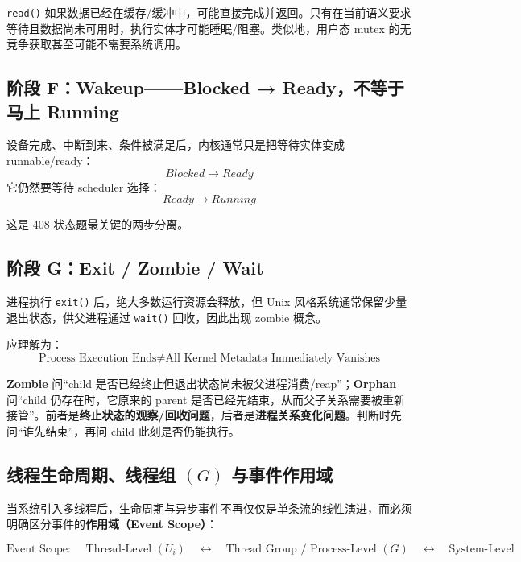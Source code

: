 \documentclass[11pt,a4paper]{ctexart}
\newcommand{\kw}[1]{\textbf{#1}}
\newcommand{\code}[1]{\texttt{#1}}
\begin{document}
\begin{warn}
\code{read()} 如果数据已经在缓存/缓冲中，可能直接完成并返回。只有在当前语义要求等待且数据尚未可用时，执行实体才可能睡眠/阻塞。类似地，用户态 mutex 的无竞争获取甚至可能不需要系统调用。
\end{warn}

\subsection{阶段 F：Wakeup——Blocked → Ready，不等于马上 Running}

设备完成、中断到来、条件被满足后，内核通常只是把等待实体变成 runnable/ready：
\[
\boxed{Blocked\rightarrow Ready}
\]
它仍然要等待 scheduler 选择：
\[
\boxed{Ready\rightarrow Running}
\]

这是 408 状态题最关键的两步分离。

\subsection{阶段 G：Exit / Zombie / Wait}

进程执行 \code{exit()} 后，绝大多数运行资源会释放，但 Unix 风格系统通常保留少量退出状态，供父进程通过 \code{wait()} 回收，因此出现 zombie 概念。

应理解为：
\[
\text{Process Execution Ends}\neq\text{All Kernel Metadata Immediately Vanishes}
\]

\begin{exam}
\kw{Zombie} 问“child 是否已经终止但退出状态尚未被父进程消费/reap”；\kw{Orphan} 问“child 仍存在时，它原来的 parent 是否已经先结束，从而父子关系需要被重新接管”。前者是\kw{终止状态的观察/回收问题}，后者是\kw{进程关系变化问题}。判断时先问“谁先结束”，再问 child 此刻是否仍能执行。
\end{exam}

\subsection{线程生命周期、线程组 \texorpdfstring{$(G)$}{(G)} 与事件作用域}

当系统引入多线程后，生命周期与异步事件不再仅仅是单条流的线性演进，而必须明确区分事件的\kw{作用域（Event Scope）}：

\[
\boxed{\text{Event Scope: }\quad \text{Thread-Level } (U_i) \quad\longleftrightarrow\quad \text{Thread Group / Process-Level } (G) \quad\longleftrightarrow\quad \text{System-Level}}
\]
\end{document}
